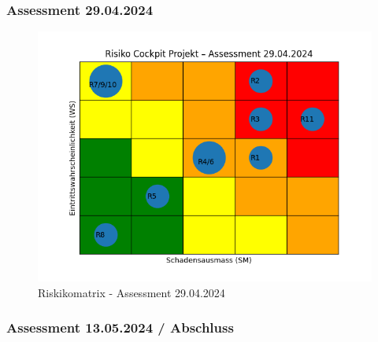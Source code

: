\begin{flushleft}
    \clearpage
    \recalctypearea
    \subsubsection{Assessment 29.04.2024}
    
\end{flushleft}
\begin{flushleft}
    \clearpage
    \recalctypearea
    \begin{figure}[H]
        \centering
        \includegraphics[width=0.75\linewidth]{source/riskmatrix/project-assessment-29-04-2024}
        \caption{Riskikomatrix - Assessment 29.04.2024}
        \label{fig:project-assessment-29-04-2024}
    \end{figure}
\end{flushleft}
\clearpage
{}
\recalctypearea
\begin{flushleft}
    \subsubsection{Assessment 13.05.2024 / Abschluss}
    
\end{flushleft}
